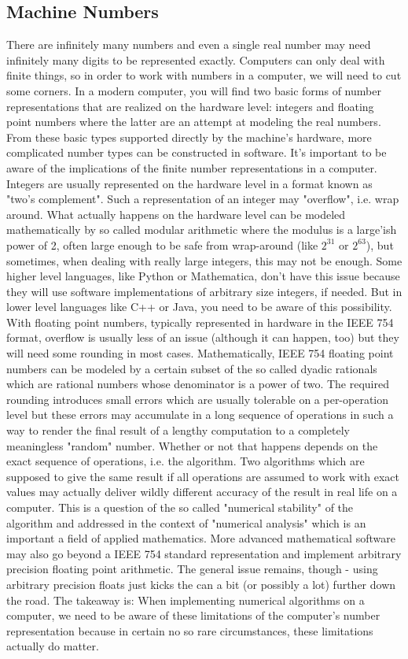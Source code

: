 \subsection{Machine Numbers}
There are infinitely many numbers and even a single real number may need infinitely many digits to be represented exactly. Computers can only deal with finite things, so in order to work with numbers in a computer, we will need to cut some corners. In a modern computer, you will find two basic forms of number representations that are realized on the hardware level: integers and floating point numbers where the latter are an attempt at modeling the real numbers. From these basic types supported directly by the machine's hardware, more complicated number types can be constructed in software. It's important to be aware of the implications of the finite number representations in a computer. Integers are usually represented on the hardware level in a format known as "two's complement". Such a representation of an integer may "overflow", i.e. wrap around. What actually happens on the hardware level can be modeled mathematically by so called modular arithmetic where the modulus is a large'ish power of 2, often large enough to be safe from wrap-around (like $2^{31}$ or $2^{63}$), but sometimes, when dealing with really large integers, this may not be enough. Some higher level languages, like Python or Mathematica, don't have this issue because they will use software implementations of arbitrary size integers, if needed. But in lower level languages like C++ or Java, you need to be aware of this possibility. With floating point numbers, typically represented in hardware in the IEEE 754 format, overflow is usually less of an issue (although it can happen, too) but they will need some rounding in most cases. Mathematically, IEEE 754 floating point numbers can be modeled by a certain subset of the so called dyadic rationals which are rational numbers whose denominator is a power of two. The required rounding introduces small errors which are usually tolerable on a per-operation level but these errors may accumulate in a long sequence of operations in such a way to render the final result of a lengthy computation to a completely meaningless "random" number. Whether or not that happens depends on the exact sequence of operations, i.e. the algorithm. Two algorithms which are supposed to give the same result if all operations are assumed to work with exact values may actually deliver wildly different accuracy of the result in real life on a computer. This is a question of the so called "numerical stability" of the algorithm and addressed in the context of "numerical analysis" which is an important a field of applied mathematics. More advanced mathematical software may also go beyond a IEEE 754 standard representation and implement arbitrary precision floating point arithmetic. The general issue remains, though - using arbitrary precision floats just kicks the can a bit (or possibly a lot) further down the road. The takeaway is: When implementing numerical algorithms on a computer, we need to be aware of these limitations of the computer's number representation because in certain no so rare circumstances, these limitations actually do matter.



